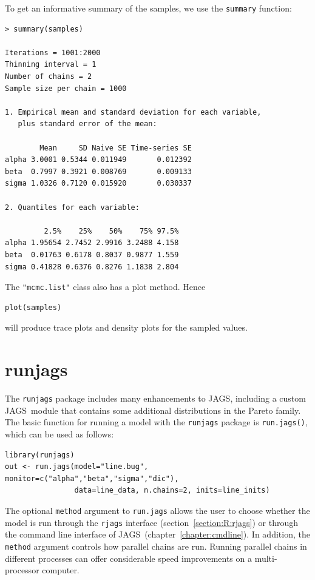 \documentclass[11pt, a4paper, titlepage]{report}
\newcommand{\JAGS}{\textsf{JAGS}}
\begin{document}
To get an informative summary of the samples, we use the
\texttt{summary} function:
\begin{verbatim}
> summary(samples)

Iterations = 1001:2000
Thinning interval = 1 
Number of chains = 2 
Sample size per chain = 1000 

1. Empirical mean and standard deviation for each variable,
   plus standard error of the mean:

        Mean     SD Naive SE Time-series SE
alpha 3.0001 0.5344 0.011949       0.012392
beta  0.7997 0.3921 0.008769       0.009133
sigma 1.0326 0.7120 0.015920       0.030337

2. Quantiles for each variable:

         2.5%    25%    50%    75% 97.5%
alpha 1.95654 2.7452 2.9916 3.2488 4.158
beta  0.01763 0.6178 0.8037 0.9877 1.559
sigma 0.41828 0.6376 0.8276 1.1838 2.804
\end{verbatim}
The \texttt{"mcmc.list"} class also has a plot method. Hence
\begin{verbatim}
plot(samples)
\end{verbatim}
will produce trace plots and density plots for the sampled values.

\section{runjags}
\label{section:R:runjags}

The \texttt{runjags} package \citep{Denwood2016} includes many
enhancements to \JAGS, including a custom \JAGS\ module that contains
some additional distributions in the Pareto family. The basic function for 
running a model with the \texttt{runjags} package is \texttt{run.jags()}, 
which can be used as follows:
\begin{verbatim}
library(runjags)
out <- run.jags(model="line.bug", monitor=c("alpha","beta","sigma","dic"),
                data=line_data, n.chains=2, inits=line_inits)
\end{verbatim}
The optional \texttt{method} argument to \texttt{run.jags} allows the
user to choose whether the model is run through the \texttt{rjags}
interface (section~\ref{section:R:rjags}) or through the command line
interface of \JAGS\ (chapter~\ref{chapter:cmdline}). In addition, the
\texttt{method} argument controls how parallel chains are run. Running
parallel chains in different processes can offer considerable speed
improvements on a multi-processor computer.
\end{document}
